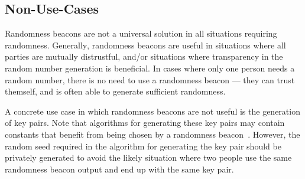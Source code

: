 \subsection{Non-Use-Cases}\label{sub:non_use_cases}
Randomness beacons are not a universal solution in all situations requiring randomness.
Generally‚ randomness beacons are useful in situations where all parties are mutually distrustful, and/or situations where transparency in the random number generation is beneficial.
In cases where only one person needs a random number, there is no need to use a randomness beacon --- they can trust themself, and is often able to generate sufficient randomness.

A concrete use case in which randomness beacons are not useful is the generation of key pairs.
Note that algorithms for generating these key pairs may contain constants that benefit from being chosen by a randomness beacon~\cite{baigneres2015trap}.
However, the random seed required in the algorithm for generating the key pair should be privately generated to avoid the likely situation where two people use the same randomness beacon output and end up with the same key pair.
